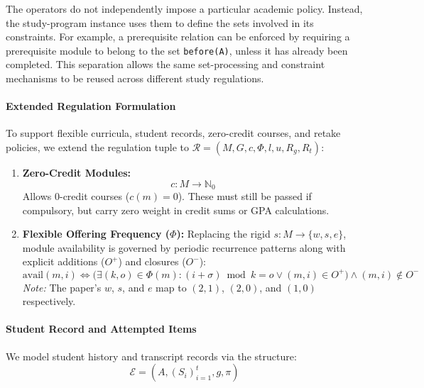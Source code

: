 \documentclass[10pt,a4paper]{article}
\begin{document}
The operators do not independently impose a particular academic policy. Instead, the study-program instance uses them to define the sets involved in its constraints. For example, a prerequisite relation can be enforced by requiring a prerequisite module to belong to the set \texttt{before(A)}, unless it has already been completed. This separation allows the same set-processing and constraint mechanisms to be reused across different study regulations.


\paragraph{Extended Regulation Formulation}

To support flexible curricula, student records, zero-credit courses, and retake policies, we extend the regulation tuple to $\mathcal{R} = (M, G, c, \Phi, l, u, R_g, R_t)$:

\begin{enumerate}
    \item \textbf{Zero-Credit Modules:} 
    $$c : M \rightarrow \mathbb{N}_0$$ 
    Allows 0-credit courses ($c(m) = 0$). These must still be passed if compulsory, but carry zero weight in credit sums or GPA calculations.
    
    \item \textbf{Flexible Offering Frequency ($\Phi$):} 
    Replacing the rigid $s : M \rightarrow \{w, s, e\}$, module availability is governed by periodic recurrence patterns along with explicit additions ($O^+$) and closures ($O^-$):
    $$\text{avail}(m,i) \iff \Big(\exists (k,o) \in \Phi(m) : (i+\sigma) \bmod k = o \lor (m,i) \in O^+\Big) \land (m,i) \notin O^-$$
    \textit{Note:} The paper's $w$, $s$, and $e$ map to $(2,1)$, $(2,0)$, and $(1,0)$ respectively.
\end{enumerate}

\paragraph{Student Record and Attempted Items}

We model student history and transcript records via the structure:
$$\mathcal{E} = (A, (S_i)_{i=1}^{t}, g, \pi)$$
\end{document}
